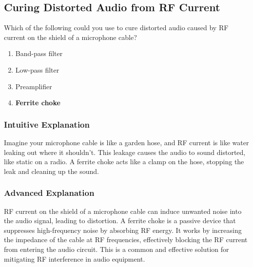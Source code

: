 \subsection{Curing Distorted Audio from RF Current}
\label{T7B04}

\begin{tcolorbox}[colback=gray!10!white,colframe=black!75!black,title=T7B04]
Which of the following could you use to cure distorted audio caused by RF current on the shield of a microphone cable?
\begin{enumerate}[noitemsep]
    \item Band-pass filter
    \item Low-pass filter
    \item Preamplifier
    \item \textbf{Ferrite choke}
\end{enumerate}
\end{tcolorbox}

\subsubsection*{Intuitive Explanation}
Imagine your microphone cable is like a garden hose, and RF current is like water leaking out where it shouldn't. This leakage causes the audio to sound distorted, like static on a radio. A ferrite choke acts like a clamp on the hose, stopping the leak and cleaning up the sound.

\subsubsection*{Advanced Explanation}
RF current on the shield of a microphone cable can induce unwanted noise into the audio signal, leading to distortion. A ferrite choke is a passive device that suppresses high-frequency noise by absorbing RF energy. It works by increasing the impedance of the cable at RF frequencies, effectively blocking the RF current from entering the audio circuit. This is a common and effective solution for mitigating RF interference in audio equipment.